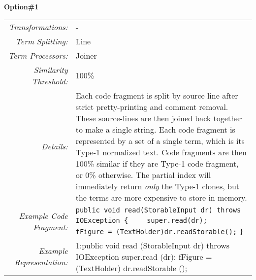 \documentclass[]{article}
\begin{document}
	\noindent \textbf{Option\#1}\\
	\begin{tabular}{rp{12.5cm}}
		\bottomrule[2pt]
		\textit{Transformations:} & - \\
		\textit{Term Splitting:}  & Line\\
		\textit{Term Processors:} & Joiner \\
		\textit{Similarity Threshold:} & 100\% \\
		\midrule
		\textit{Details:}         & Each code fragment is split by source line after strict pretty-printing and comment removal.  These source-lines are then joined back together to make a single string.  Each code fragment is represented by a set of a single term, which is its Type-1 normalized text.  Code fragments are then 100\% similar if they are Type-1 code fragment, or 0\% otherwise.  The partial index will immediately return \textit{only} the Type-1 clones, but the terms are more expensive to store in memory.\\
		\midrule
		\textit{Example Code Fragment:} & \verb|public void read(StorableInput dr) throws IOException {|\newline
			                              \verb|    super.read(dr);|\newline
             			                  \verb|    fFigure = (TextHolder)dr.readStorable();|\newline
		                                  \verb|}|\\
		\textit{Example Representation:} & 1:public void read (StorableInput dr) throws IOException { super.read (dr); fFigure = (TextHolder) dr.readStorable (); }\\
		\bottomrule[2pt]
	\end{tabular} \\\\
	
\end{document}
